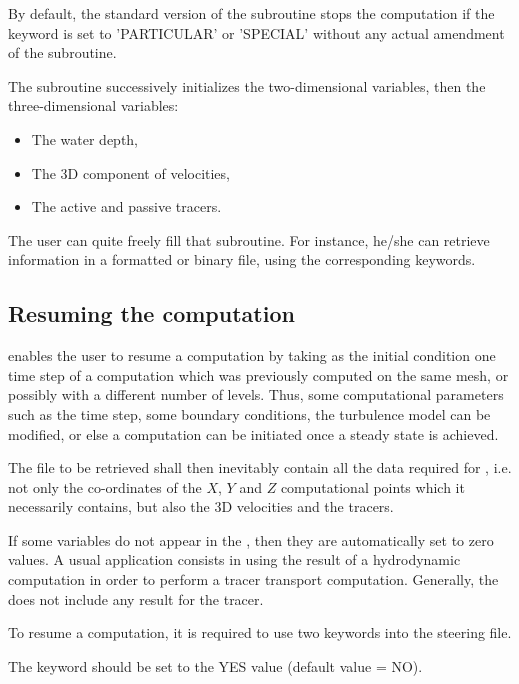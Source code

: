 By default, the standard version of the  subroutine
stops the computation if the keyword  is set to
'PARTICULAR' or 'SPECIAL' without any actual amendment of the subroutine.

The  subroutine successively initializes the two-dimensional
variables, then the three-dimensional variables:

\begin{itemize}
\item The water depth,

\item The 3D component of velocities,

\item The active and passive tracers.
\end{itemize}

The user can quite freely fill that subroutine. For instance, he/she can
retrieve information in a formatted or binary file, using the corresponding
keywords.


\subsection{Resuming the computation}

 enables the user to resume a computation by taking as the initial
condition one time step of a computation which was previously computed on
the same mesh, or possibly with a different number of levels. Thus, some
computational parameters such as the time step, some boundary conditions, the
turbulence model can be modified, or else a computation can be initiated once a
steady state is achieved.

The file to be retrieved shall then inevitably contain all the data required
for , i.e. not only the co-ordinates of the $X$, $Y$
and $Z$ computational points which it necessarily contains, but also the
3D velocities and the tracers.

If some variables do not appear in the , then they are automatically set to zero values.  A usual application
consists in using the result of a hydrodynamic computation in order to perform
a tracer transport computation. Generally, the  does not include any result for the tracer.

To resume a computation, it is required to use two keywords into the steering
file.

The keyword  should be set to the YES value
(default value = NO).

